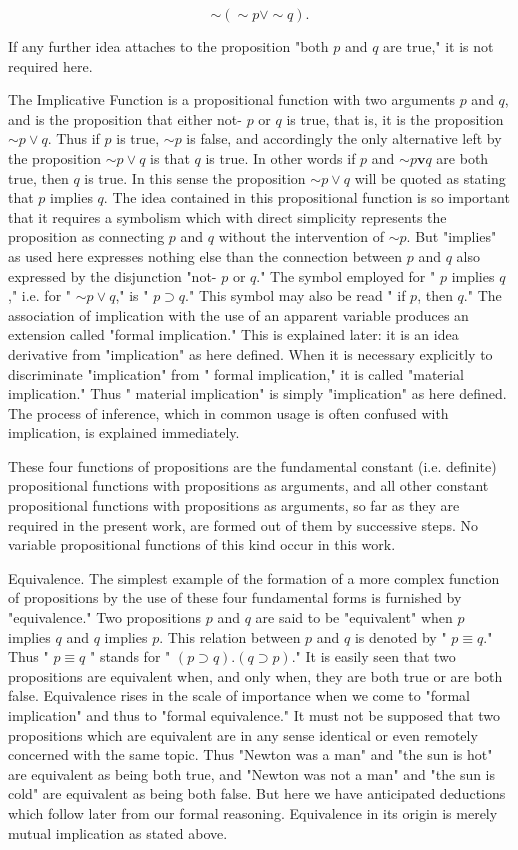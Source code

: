 \documentclass[10pt]{article}
\begin{document}
$$
\sim(\sim p \vee \sim q) .
$$

If any further idea attaches to the proposition "both $p$ and $q$ are true," it is not required here.

The Implicative Function is a propositional function with two arguments $p$ and $q$, and is the proposition that either not- $p$ or $q$ is true, that is, it is the proposition $\sim p \vee q$. Thus if $p$ is true, $\sim p$ is false, and accordingly the only alternative left by the proposition $\sim p \vee q$ is that $q$ is true. In other words if $p$ and $\sim p \mathbf{v} q$ are both true, then $q$ is true. In this sense the proposition $\sim p \vee q$ will be quoted as stating that $p$ implies $q$. The idea contained in this propositional function is so important that it requires a symbolism which with direct simplicity represents the proposition as connecting $p$ and $q$ without the intervention of $\sim p$. But "implies" as used here expresses nothing else than the connection between $p$ and $q$ also expressed by the disjunction "not- $p$ or $q$." The symbol employed for " $p$ implies $q$," i.e. for " $\sim p \vee q$," is " $p \supset q$." This symbol may also be read " if $p$, then $q$." The association of implication with the use of an apparent variable produces an extension called "formal implication." This is explained later: it is an idea derivative from "implication" as here defined. When it is necessary explicitly to discriminate "implication" from " formal implication," it is called "material implication." Thus " material implication" is simply "implication" as here defined. The process of inference, which in common usage is often confused with implication, is explained immediately.

These four functions of propositions are the fundamental constant (i.e. definite) propositional functions with propositions as arguments, and all other constant propositional functions with propositions as arguments, so far as they are required in the present work, are formed out of them by successive steps. No variable propositional functions of this kind occur in this work.

Equivalence. The simplest example of the formation of a more complex function of propositions by the use of these four fundamental forms is furnished by "equivalence." Two propositions $p$ and $q$ are said to be "equivalent" when $p$ implies $q$ and $q$ implies $p$. This relation between $p$ and $q$ is denoted by " $p \equiv q$." Thus " $p \equiv q$ " stands for " $(p \supset q) .(q \supset p)$." It is easily seen that two propositions are equivalent when, and only when, they are both true or are both false. Equivalence rises in the scale of importance when we come to "formal implication" and thus to "formal equivalence." It must not be supposed that two propositions which are equivalent are in any sense identical or even remotely concerned with the same topic. Thus "Newton was a man" and "the sun is hot" are equivalent as being both true, and "Newton was not a man" and "the sun is cold" are equivalent as being both false. But here we have anticipated deductions which follow later from our formal reasoning. Equivalence in its origin is merely mutual implication as stated above.
\end{document}
